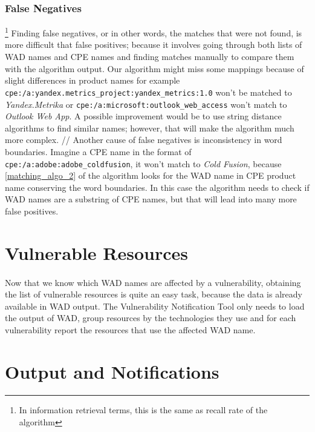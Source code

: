 \subsubsection{False Negatives}\footnote{In information retrieval terms, this is the same as recall rate of the algorithm}
Finding false negatives, or in other words, the matches that were not found, is more difficult that false positives; because it involves going through both lists of WAD names and CPE names and finding matches manually to compare them with the algorithm output. Our algorithm might miss some mappings because of slight differences in product names for example  \texttt{cpe:/a:yandex.metrics\_project:yandex\_metrics:1.0} won't be matched to \textit{Yandex.Metrika} or \texttt{cpe:/a:microsoft:outlook\_web\_access} won't match to \textit{Outlook Web App}. A possible improvement would be to use string distance algorithms to find similar names; however, that will make the algorithm much more complex.
//
Another cause of false negatives is inconsistency in word boundaries. Imagine a CPE name in the format of \texttt{cpe:/a:adobe:adobe\_coldfusion}, it won't match to \textit{Cold Fusion}, because \ref{matching_algo_2} of the algorithm looks for the WAD name in CPE product name conserving the word boundaries. In this case the algorithm needs to check if WAD names are a substring of CPE names, but that will lead into many more false positives.

\section{Vulnerable Resources}
\paragraph{}
Now that we know which WAD names are affected by a vulnerability, obtaining the list of vulnerable resources is quite an easy task, because the data is already available in WAD output. The Vulnerability Notification Tool only needs to load the output of WAD, group resources by the technologies they use and for each vulnerability report the resources that use the affected WAD name.
\section{Output and Notifications}
\paragraph{}

